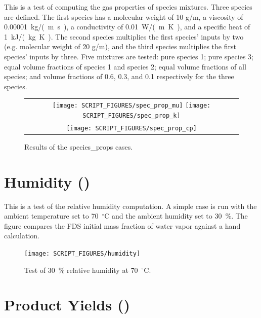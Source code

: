 \documentclass[11pt]{book}
\begin{document}
This is a test of computing the gas properties of species mixtures. Three species are defined. The first species has a molecular weight of 10 g/m, a viscosity of 0.00001~\si{kg/(m.s)},
a conductivity of 0.01~\si{W/(m.K)}, and a specific heat of 1~\si{kJ/(kg.K)}. The second species multiplies the first species' inputs by two (e.g. molecular weight of 20 g/m), and the third species multiplies the first species' inputs by three. Five mixtures are tested: pure species 1; pure species 3; equal volume fractions of species 1 and species 2; equal volume fractions of all species; and volume fractions of 0.6, 0.3, and 0.1 respectively for the three species.

\begin{figure}[ht]
	\centering
	\begin{tabular}{c}
      \texttt{[image: SCRIPT\_FIGURES/spec\_prop\_mu]}
      \texttt{[image: SCRIPT\_FIGURES/spec\_prop\_k]} \\
      \texttt{[image: SCRIPT\_FIGURES/spec\_prop\_cp]}
   \end{tabular}
   \caption[Results of the {\ct species\_props} cases]{Results of the {\ct species\_props} cases.}
   \label{fig_species_props}
\end{figure}

\section{Humidity (\texorpdfstring{}{humidity})}
\label{humidity}

This is a test of the relative humidity computation. A simple case is run with the ambient temperature set to 70~$^{\circ}$C and the ambient humidity set to 30~\%. The figure compares  the FDS initial mass fraction of water vapor against a hand calculation.

\begin{figure}[ht]
	\centering
	\texttt{[image: SCRIPT\_FIGURES/humidity]}
	\caption[Test of 30~\% relative humidity at 70~$^{\circ}$C]{Test of 30~\% relative humidity at 70~$^{\circ}$C. }
	\label{fig_humidity}
\end{figure}

\section{Product Yields (\texorpdfstring{}{methane\_flame})}
\label{methane_flame}
\end{document}
